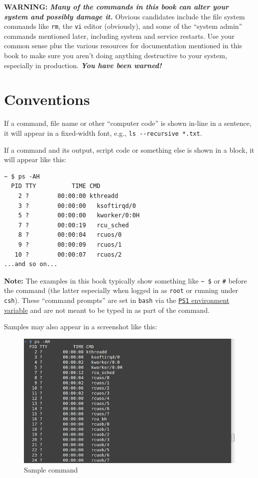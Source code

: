 \documentclass[10pt,]{book}
\numberwithin{figure}{chapter}
\begin{document}
\textbf{WARNING:} \textbf{\emph{Many of the commands in this book can
alter your system and possibly damage it.}} Obvious candidates include
the file system commands like \texttt{rm}, the \texttt{vi} editor
(obviously), and some of the ``system admin'' commands mentioned later,
including system and service restarts. Use your common sense plus the
various resources for documentation mentioned in this book to make sure
you aren't doing anything destructive to your system, especially in
production. \textbf{\emph{You have been warned!}}

\section{Conventions}\label{conventions}

If a command, file name or other ``computer code'' is shown in-line in a
sentence, it will appear in a fixed-width font, e.g.,
\texttt{ls -{}-recursive *.txt}.

If a command and its output, script code or something else is shown in a
block, it will appear like this:

\begin{verbatim}
~ $ ps -AH
  PID TTY          TIME CMD
    2 ?        00:00:00 kthreadd
    3 ?        00:00:00   ksoftirqd/0
    5 ?        00:00:00   kworker/0:0H
    7 ?        00:00:19   rcu_sched
    8 ?        00:00:04   rcuos/0
    9 ?        00:00:09   rcuos/1
   10 ?        00:00:07   rcuos/2
...and so on...
\end{verbatim}

\textbf{Note:} The examples in this book typically show something like
\texttt{\textasciitilde{} \$} or \texttt{\#} before the command (the
latter especially when logged in as \texttt{root} or running under
\texttt{csh}). These ``command prompts'' are set in \texttt{bash} via
the
\href{https://www.linux.com/learn/docs/ldp/443-bash-prompt-howto}{\texttt{PS1}
environment variable} and are not meant to be typed in as part of the
command.

Samples may also appear in a screenshot like this:

\ifxetex

\begin{figure}[!htbp]
\includegraphics{./images/ps-AH.png}%
\caption{Sample command}%
\end{figure}
\end{document}
